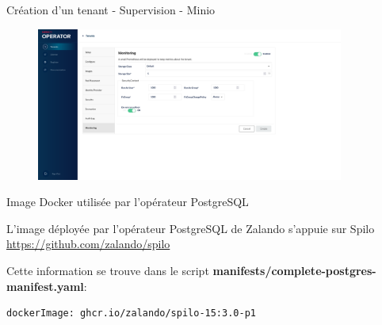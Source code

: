 \begin{frame}[fragile]{Création d'un tenant - Supervision - Minio}

\begin{figure}
\begin{center}
\includegraphics[angle=0, width=0.9\textwidth, height=0.9\textheight]{images/monitoring_minio.eps}
\end{center}
\end{figure}

\end{frame}


%
%


\begin{frame}[fragile]{Image Docker utilisée par l'opérateur PostgreSQL}

   L'image déployée par l'opérateur PostgreSQL de Zalando s'appuie sur Spilo 
\url{https://github.com/zalando/spilo}

   Cette information se trouve dans le script \textbf{manifests/complete-postgres-manifest.yaml}:
\begin{Verbatim}[commandchars=\&\#\#]
  dockerImage: ghcr.io/zalando/spilo-15:3.0-p1
\end{Verbatim}

\end{frame}


